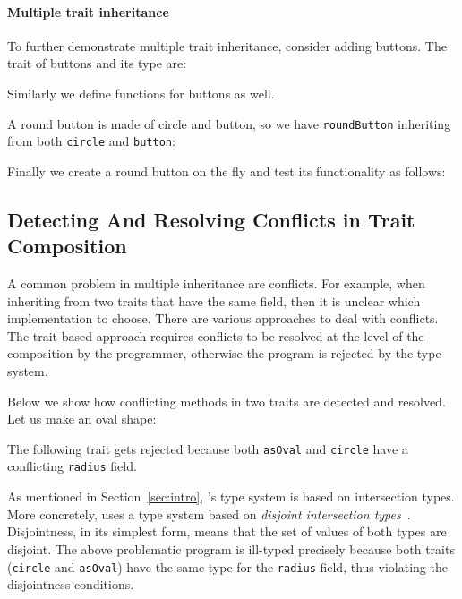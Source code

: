 \paragraph{Multiple trait inheritance} To further demonstrate multiple
trait inheritance, consider adding buttons. The trait of buttons and its type are:

Similarly we define functions for buttons as well.

\noindent A round button is made of circle and button, so we have
\lstinline{roundButton} inheriting from both \lstinline{circle} and
\lstinline{button}:

\noindent Finally we create a round button on the fly and test its functionality
as follows:

\subsection{Detecting And Resolving Conflicts in Trait Composition}
\label{sec:conflicts}

A common problem in multiple inheritance are conflicts. For example, when
inheriting from two traits that have the same field, then it is unclear which
implementation to choose. There are various approaches to deal with conflicts.
The trait-based approach requires conflicts to be resolved at the level of the
composition by the programmer, otherwise the program is rejected by the type
system.

Below we show how conflicting methods in two traits are detected
and resolved. Let us make an oval shape:

The following trait gets rejected because both \lstinline{asOval} and
\lstinline{circle} have a conflicting \lstinline{radius} field.

\noindent As mentioned in Section~\ref{sec:intro}, \name's type system is based
on intersection types. More concretely, \name uses a type system based on
\emph{disjoint intersection types}~\cite{oliveira2016disjoint}. Disjointness, in
its simplest form, means that the set of values of both types are disjoint. The
above problematic program is ill-typed precisely because both
traits (\lstinline{circle} and \lstinline{asOval}) have the same type for the
\lstinline{radius} field, thus violating the disjointness conditions.

